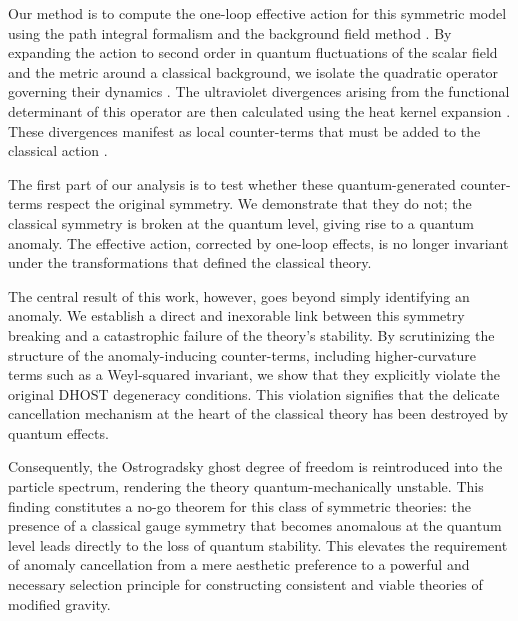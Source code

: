 \documentclass[twocolumn]{aastex631}
\begin{document}
Our method is to compute the one-loop effective action for this symmetric model using the path integral formalism and the background field method \citep{ferrero2025oneloopeffectiveactioncoherent,ferrero2025oneloopeffectiveactioncoherent}. By expanding the action to second order in quantum fluctuations of the scalar field and the metric around a classical background, we isolate the quadratic operator governing their dynamics \citep{ferrero2025oneloopeffectiveactioncoherent}. The ultraviolet divergences arising from the functional determinant of this operator are then calculated using the heat kernel expansion \citep{branchina2024pathintegralmeasurecosmological,ferrero2025oneloopeffectiveactioncoherent}. These divergences manifest as local counter-terms that must be added to the classical action \citep{ferrero2025oneloopeffectiveactioncoherent}.

The first part of our analysis is to test whether these quantum-generated counter-terms respect the original symmetry. We demonstrate that they do not; the classical symmetry is broken at the quantum level, giving rise to a quantum anomaly. The effective action, corrected by one-loop effects, is no longer invariant under the transformations that defined the classical theory.

The central result of this work, however, goes beyond simply identifying an anomaly. We establish a direct and inexorable link between this symmetry breaking and a catastrophic failure of the theory's stability. By scrutinizing the structure of the anomaly-inducing counter-terms, including higher-curvature terms such as a Weyl-squared invariant, we show that they explicitly violate the original DHOST degeneracy conditions. This violation signifies that the delicate cancellation mechanism at the heart of the classical theory has been destroyed by quantum effects.

Consequently, the Ostrogradsky ghost degree of freedom is reintroduced into the particle spectrum, rendering the theory quantum-mechanically unstable. This finding constitutes a no-go theorem for this class of symmetric theories: the presence of a classical gauge symmetry that becomes anomalous at the quantum level leads directly to the loss of quantum stability. This elevates the requirement of anomaly cancellation from a mere aesthetic preference to a powerful and necessary selection principle for constructing consistent and viable theories of modified gravity.
\end{document}
